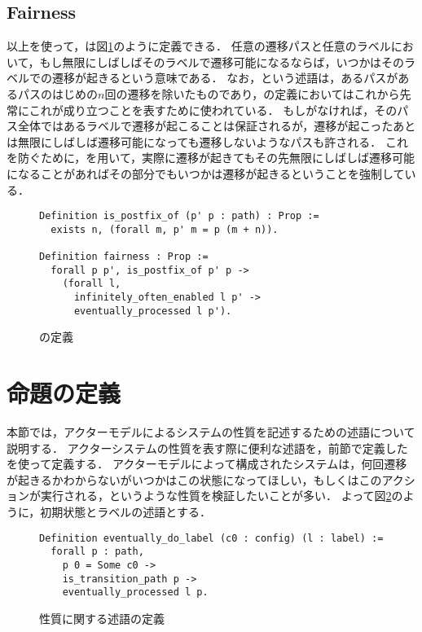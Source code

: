 \subsection{Fairness}
以上を使って，\fairness は図\ref{code:formalization:fairness}のように定義できる．
任意の遷移パスと任意のラベルにおいて，もし無限にしばしばそのラベルで遷移可能になるならば，いつかはそのラベルでの遷移が起きるという意味である．
なお，という述語は，あるパスがあるパスのはじめの$n$回の遷移を除いたものであり，\fairness の定義においてはこれから先常にこれが成り立つことを表すために使われている．
もしがなければ，そのパス全体ではあるラベルで遷移が起こることは保証されるが，遷移が起こったあとは無限にしばしば遷移可能になっても遷移しないようなパスも許される．
これを防ぐために，を用いて，実際に遷移が起きてもその先無限にしばしば遷移可能になることがあればその部分でもいつかは遷移が起きるということを強制している．

\begin{figure}
\begin{lstlisting}
Definition is_postfix_of (p' p : path) : Prop :=
  exists n, (forall m, p' m = p (m + n)).

Definition fairness : Prop :=
  forall p p', is_postfix_of p' p ->
    (forall l,
      infinitely_often_enabled l p' ->
      eventually_processed l p').
\end{lstlisting}
\caption{\fairness の定義}\label{code:formalization:fairness}
\end{figure}

\section{命題の定義}

本節では，アクターモデルによるシステムの性質を記述するための述語について説明する．
アクターシステムの性質を表す際に便利な述語を，前節で定義したを使って定義する．
アクターモデルによって構成されたシステムは，何回遷移が起きるかわからないがいつかはこの状態になってほしい，もしくはこのアクションが実行される，というような性質を検証したいことが多い．
よって図\ref{code:proof:ev-do-label}のように，初期状態とラベルの述語とする．

\begin{figure}
\begin{lstlisting}
Definition eventually_do_label (c0 : config) (l : label) :=
  forall p : path,
    p 0 = Some c0 ->
    is_transition_path p ->
    eventually_processed l p.
\end{lstlisting}
\caption{性質に関する述語の定義}\label{code:proof:ev-do-label}
\end{figure}

